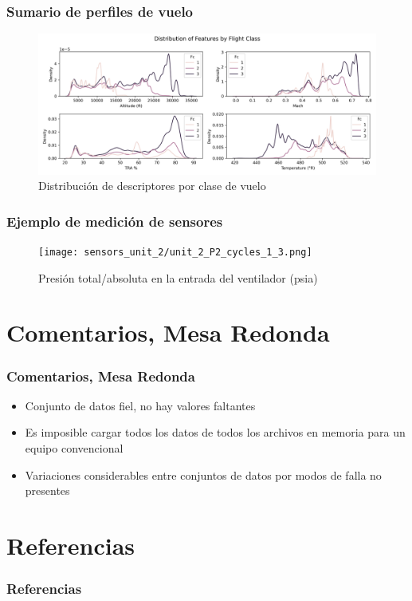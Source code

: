 \documentclass{beamer}
\begin{document}
        \begin{frame}
            \frametitle{Sumario de perfiles de vuelo}
            \begin{figure}[!htbp]
                \centering
                \includegraphics[scale=0.4]{features_per_condition_fc.png}
                \caption{Distribución de descriptores por clase de vuelo}
            \end{figure}
        \end{frame}

        \begin{frame}
            \frametitle{Ejemplo de medición de sensores}
            \begin{figure}[!htbp]
                \centering
                \texttt{[image: sensors\_unit\_2/unit\_2\_P2\_cycles\_1\_3.png]}
                \caption{Presión total/absoluta en la entrada del ventilador (psia)}
            \end{figure}
        \end{frame}

    \section{Comentarios, Mesa Redonda}

        \begin{frame}
            \frametitle{Comentarios, Mesa Redonda}
            \begin{itemize}
                \item Conjunto de datos fiel, no hay valores faltantes
                \item Es imposible cargar todos los datos de todos los archivos en memoria para un equipo convencional
                \item Variaciones considerables entre conjuntos de datos por modos de falla no presentes
            \end{itemize}
        \end{frame}


    \section{Referencias}
        \begin{frame}
            \frametitle{Referencias}
            \printbibliography
        \end{frame}
\end{document}
